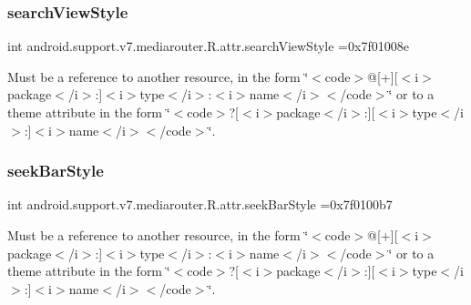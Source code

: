 \subsubsection{\texorpdfstring{search\+View\+Style}{searchViewStyle}}
{\footnotesize\ttfamily int android.\+support.\+v7.\+mediarouter.\+R.\+attr.\+search\+View\+Style =0x7f01008e\hspace{0.3cm}{\ttfamily [static]}}

Must be a reference to another resource, in the form \char`\"{}$<$code$>$@\mbox{[}+\mbox{]}\mbox{[}$<$i$>$package$<$/i$>$\+:\mbox{]}$<$i$>$type$<$/i$>$\+:$<$i$>$name$<$/i$>$$<$/code$>$\char`\"{} or to a theme attribute in the form \char`\"{}$<$code$>$?\mbox{[}$<$i$>$package$<$/i$>$\+:\mbox{]}\mbox{[}$<$i$>$type$<$/i$>$\+:\mbox{]}$<$i$>$name$<$/i$>$$<$/code$>$\char`\"{}. \mbox{\label{classandroid_1_1support_1_1v7_1_1mediarouter_1_1R_1_1attr_a6a80804b15540907133815a78dc78390}} 
\subsubsection{\texorpdfstring{seek\+Bar\+Style}{seekBarStyle}}
{\footnotesize\ttfamily int android.\+support.\+v7.\+mediarouter.\+R.\+attr.\+seek\+Bar\+Style =0x7f0100b7\hspace{0.3cm}{\ttfamily [static]}}

Must be a reference to another resource, in the form \char`\"{}$<$code$>$@\mbox{[}+\mbox{]}\mbox{[}$<$i$>$package$<$/i$>$\+:\mbox{]}$<$i$>$type$<$/i$>$\+:$<$i$>$name$<$/i$>$$<$/code$>$\char`\"{} or to a theme attribute in the form \char`\"{}$<$code$>$?\mbox{[}$<$i$>$package$<$/i$>$\+:\mbox{]}\mbox{[}$<$i$>$type$<$/i$>$\+:\mbox{]}$<$i$>$name$<$/i$>$$<$/code$>$\char`\"{}. \mbox{\label{classandroid_1_1support_1_1v7_1_1mediarouter_1_1R_1_1attr_a64acf946f49f574fc151db8f6e8a22f4}} 
